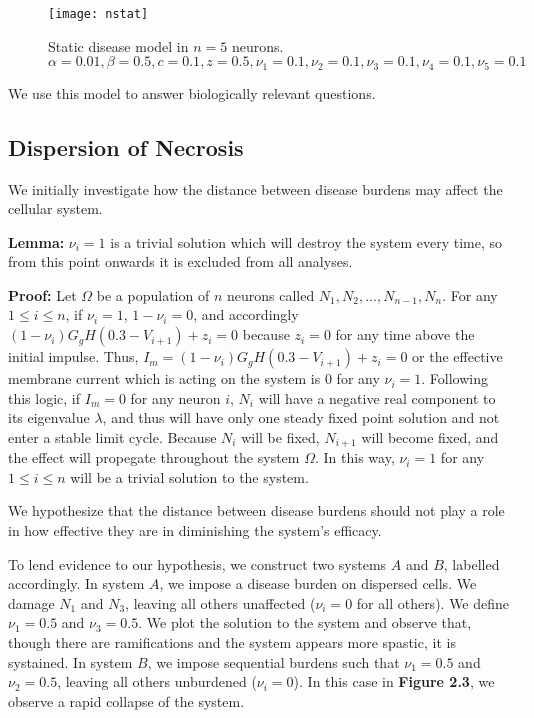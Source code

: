 \documentclass[11pt]{report}
\begin{document}
\begin{figure}[!ht]
  \caption{Static disease model in $n=5$ neurons. $\alpha = 0.01, \beta = 0.5,c = 0.1,z = 0.5, \nu_1 = 0.1, \nu_2 = 0.1, \nu_3 = 0.1, \nu_4 = 0.1, \nu_5 = 0.1$ }
  \centering
    \texttt{[image: nstat]}
\end{figure}


We use this model to answer biologically relevant questions. 


\subsection{Dispersion of Necrosis} %
\label{sub:dispersion_of_necrosis}


We initially investigate how the distance between disease burdens may affect the cellular system.

\textbf{Lemma:} $\nu_i=1$ is a trivial solution which will destroy the system every time, so from this point onwards it is excluded from all analyses.

\textbf{Proof:} Let $\Omega$ be a population of $n$ neurons called $N_1, N_2, ..., N_{n-1}, N_n$. For any $1 \leq i \leq n$, if $\nu_i=1$, $1-\nu_i=0$, and accordingly $(1-\nu_i) G_g H(0.3 -V_{i+1}) + z_i=0$ because $z_i=0$ for any time above the initial impulse. Thus, $I_{m} = (1-\nu_i) G_g H(0.3-V_{i+1}) + z_i = 0$ or the effective membrane current which is acting on the system is $0$ for any $\nu_i=1$. Following this logic, if $I_m=0$ for any neuron $i$, $N_i$ will have a negative real component to its eigenvalue $\lambda$, and thus will have only one steady fixed point solution and not enter a stable limit cycle. Because $N_i$ will be fixed, $N_{i+1}$ will become fixed, and the effect will propegate throughout the system $\Omega$. In this way, $\nu_i=1$ for any $1 \leq i \leq n$ will be a trivial solution to the system.

We hypothesize that the distance between disease burdens should not play a role in how effective they are in diminishing the system's efficacy. 

To lend evidence to our hypothesis, we construct two systems $A$ and $B$, labelled accordingly. In system $A$, we impose a disease burden on dispersed cells. We damage $N_1$ and $N_3$, leaving all others unaffected ($\nu_i = 0$ for all others). We define $\nu_1 = 0.5$ and $\nu_3 = 0.5$. We plot the solution to the system and observe that, though there are ramifications and the system appears more spastic, it is systained. In system $B$, we impose sequential burdens such that $\nu_1 = 0.5$ and $\nu_2 = 0.5$, leaving all others unburdened ($\nu_i = 0$). In this case in \textbf{Figure 2.3}, we observe a rapid collapse of the system. 
\end{document}
